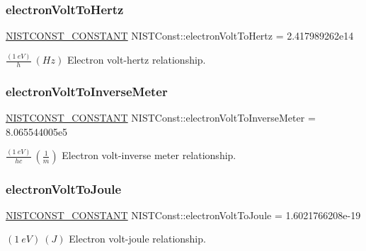 \subsubsection{\texorpdfstring{electron\+Volt\+To\+Hertz}{electronVoltToHertz}}
{\footnotesize\ttfamily \mbox{\hyperlink{group___n_i_s_t_const-_macros_ga2b0fc1d7452373f816175dd86ce26729}{N\+I\+S\+T\+C\+O\+N\+S\+T\+\_\+\+C\+O\+N\+S\+T\+A\+NT}} N\+I\+S\+T\+Const\+::electron\+Volt\+To\+Hertz = 2.\+417989262e14}

$\frac{(1\ eV)}{h} \ (Hz)$ Electron volt-\/hertz relationship. \mbox{\label{group___n_i_s_t_const-_electron_volt_ga333e07ed95192173791fcf53673f79ef}} 
\subsubsection{\texorpdfstring{electron\+Volt\+To\+Inverse\+Meter}{electronVoltToInverseMeter}}
{\footnotesize\ttfamily \mbox{\hyperlink{group___n_i_s_t_const-_macros_ga2b0fc1d7452373f816175dd86ce26729}{N\+I\+S\+T\+C\+O\+N\+S\+T\+\_\+\+C\+O\+N\+S\+T\+A\+NT}} N\+I\+S\+T\+Const\+::electron\+Volt\+To\+Inverse\+Meter = 8.\+065544005e5}

$\frac{(1\ eV)}{hc} \ (\frac{1}{m})$ Electron volt-\/inverse meter relationship. \mbox{\label{group___n_i_s_t_const-_electron_volt_ga214ec0b05df4113393bd1d3e631aebe6}} 
\subsubsection{\texorpdfstring{electron\+Volt\+To\+Joule}{electronVoltToJoule}}
{\footnotesize\ttfamily \mbox{\hyperlink{group___n_i_s_t_const-_macros_ga2b0fc1d7452373f816175dd86ce26729}{N\+I\+S\+T\+C\+O\+N\+S\+T\+\_\+\+C\+O\+N\+S\+T\+A\+NT}} N\+I\+S\+T\+Const\+::electron\+Volt\+To\+Joule = 1.\+6021766208e-\/19}

$(1\ eV) \ (J)$ Electron volt-\/joule relationship. \mbox{\label{group___n_i_s_t_const-_electron_volt_gaaac3cf941012add952f4aee0c72f0a42}} 
